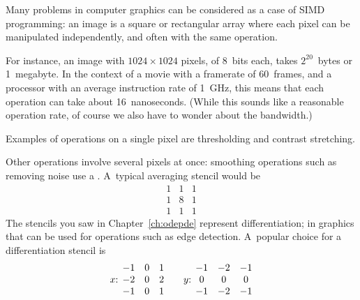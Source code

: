 

Many problems in computer graphics can be
considered as a case of \ac{SIMD} programming:
an image is a square or rectangular array
where each pixel can be manipulated independently,
and often with the same operation.

For instance, an image with $1024\times 1024$
pixels, of 8~bits each, takes $2^{20}$~bytes or 1~megabyte.
In the context of a movie with a framerate of 60~frames,
and a processor with an average instruction rate
of 1~GHz, this means that each operation can take about 16~nanoseconds.
%
(While this sounds like a reasonable operation rate,
of course we also have to wonder about the bandwidth.)

Examples of operations on a single pixel are
thresholding and contrast stretching.

Other operations involve several pixels at once:
smoothing operations such as removing noise
use a .
A~typical averaging stencil would be 
\[
\begin{matrix}
  1&1&1\\ 1&8&1\\ 1&1&1
\end{matrix}
\]
The stencils you saw in Chapter~\ref{ch:odepde} represent
differentiation; in graphics that can be used for operations
such as edge detection. A~popular choice for a differentiation stencil is
\[
\hbox{$x$: }
\begin{matrix}
  -1&0&1\\ -2&0&2\\ -1&0&1
\end{matrix}
\qquad\hbox{$y$: }
\begin{matrix}
  -1&-2&-1\\ 0&0&0\\ -1&-2&-1
\end{matrix}
\]


